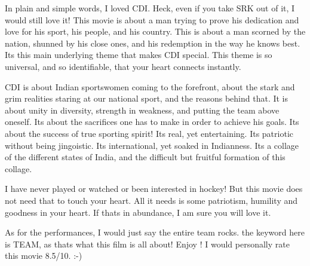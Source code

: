 \documentclass[]{article}
\begin{document}
In plain and simple words, I loved CDI. Heck, even if you take SRK out of it, I would still love it! This movie is about a man trying to prove his dedication and love for his sport, his people, and his country. This is about a man scorned by the nation, shunned by his close ones, and his redemption in the way he knows best. Its this main underlying theme that makes CDI special. This theme is so universal, and so identifiable, that your heart connects instantly.

CDI is about Indian sportswomen coming to the forefront, about the stark and grim realities staring at our national sport, and the reasons behind that. It is about unity in diversity, strength in weakness, and putting the team above oneself. Its about the sacrifices one has to make in order to achieve his goals. Its about the success of true sporting spirit! Its real, yet entertaining. Its patriotic without being jingoistic. Its international, yet soaked in Indianness. Its a collage of the different states of India, and the difficult but fruitful formation of this collage.

I have never played or watched or been interested in hockey! But this movie does not need that to touch your heart. All it needs is some patriotism, humility and goodness in your heart. If thats in abundance, I am sure you will love it.

As for the performances, I would just say the entire team rocks. the keyword here is TEAM, as thats what this film is all about! Enjoy !
I would personally rate this movie 8.5/10. :-)
\end{document}
